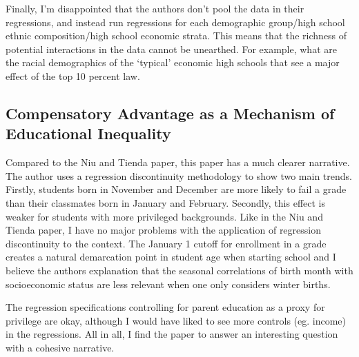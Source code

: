 \documentclass[12 pt, leqno]{article}
\begin{document}
Finally, I'm disappointed that the authors don't pool the data in their regressions, and instead run regressions for each demographic group/high school ethnic composition/high school economic strata. This means that the richness of potential interactions in the data cannot be unearthed. For example, what are the racial demographics of the `typical' economic high schools that see a major effect of the top 10 percent law. 

\subsection*{Compensatory Advantage as a Mechanism of Educational Inequality}

Compared to the Niu and Tienda paper, this paper has a much clearer narrative. The author uses a regression discontinuity methodology to show two main trends. Firstly, students born in November and December are more likely to fail a grade than their classmates born in January and February. Secondly, this effect is weaker for students with more privileged backgrounds. Like in the Niu and Tienda paper, I have no major problems with the application of regression discontinuity to the context. The January 1 cutoff for enrollment in a grade creates a natural demarcation point in student age when starting school and I believe the authors explanation that the seasonal correlations of birth month with socioeconomic status are less relevant when one only considers winter births. 

The regression specifications controlling for parent education as a proxy for privilege are okay, although I would have liked to see more controls (eg. income) in the regressions. All in all, I find the paper to answer an interesting question with a cohesive narrative. 
\end{document}
